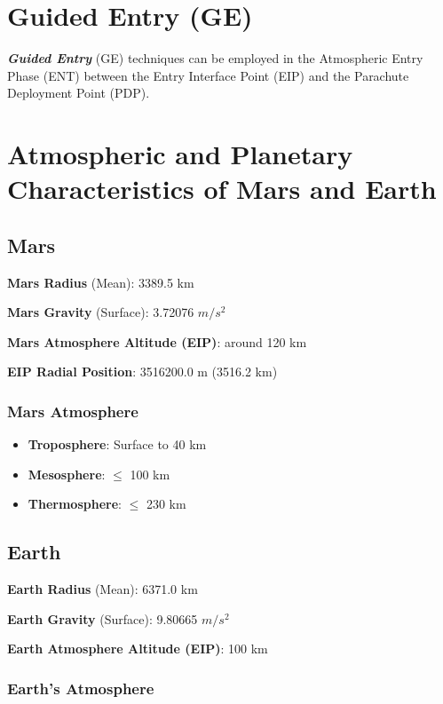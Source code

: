 
\section{Guided Entry (GE)}

    \textbf{\textit{Guided Entry}} (GE) techniques can be employed in the Atmospheric Entry Phase (ENT)
    between the Entry Interface Point (EIP) and the Parachute Deployment Point (PDP).

\section{Atmospheric and Planetary Characteristics of Mars and Earth}

    \subsection{Mars}

        \textbf{Mars Radius} (Mean): 3389.5 km

        \textbf{Mars Gravity} (Surface): 3.72076 $m/s^2$

        \textbf{Mars Atmosphere Altitude (EIP)}: around 120 km

        \textbf{EIP Radial Position}: 3516200.0 m (3516.2 km)

        \subsubsection{Mars Atmosphere}

            \begin{itemize}
                \item \textbf{Troposphere}: Surface to 40 km
                \item \textbf{Mesosphere}: $\leq$ 100 km
                \item \textbf{Thermosphere}: $\leq$ 230 km
            \end{itemize}


    \subsection{Earth}

        \textbf{Earth Radius} (Mean): 6371.0 km

        \textbf{Earth Gravity} (Surface): 9.80665 $m/s^2$

        \textbf{Earth Atmosphere Altitude (EIP)}: 100 km

        \subsubsection{Earth's Atmosphere}

